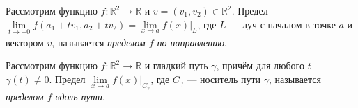 \begin{ndefinition}
	Рассмотрим функцию \(f \colon \mathbb{R}^2 \to \mathbb{R}\) и \(v = (v_1, v_2) \in \mathbb{R}^2\). Предел \(\lim\limits_{t \to +0} f(a_1 + t v_1, a_2 + t v_2) = \lim\limits_{x \to a} f(x) |_L\), где \(L\) --- луч с началом в точке \(a\) и вектором \(v\), называется \textit{пределом \(f\) по направлению}.
\end{ndefinition}

\begin{ndefinition}
	Рассмотрим функцию \(f \colon \mathbb{R}^2 \to \mathbb{R}\) и гладкий путь \(\gamma\), причём для любого \(t\) \(\gamma(t) \neq 0\). Предел \(\lim\limits_{x \to a} f(x) |_{C_\gamma}\), где \(C_\gamma\) --- носитель пути \(\gamma\), называется \textit{пределом \(f\) вдоль пути}.
\end{ndefinition}